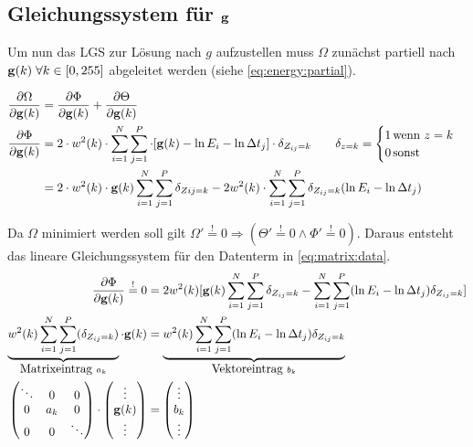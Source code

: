 \subsection{Gleichungssystem für $\mathbf g$}
Um nun das \gls{LGS} zur Lösung nach $g$ aufzustellen muss $\Omega$ zunächst partiell nach $\mathbf g(k) \; \forall k \in [0,255]$ abgeleitet werden (siehe \autoref{eq:energy:partial}).

\begin{align}
\label{eq:energy:partial}
\frac{\partial \Omega}{\partial \mathbf g(k)} & = \frac{\partial \Phi}{\partial \mathbf g(k)} +\frac{\partial \Theta}{\partial \mathbf g(k)}\\
\frac{\partial \Phi}{\partial \mathbf g(k)} &= 2\cdot w^2(k) \cdot \sum \limits_{i=1}^{N} \sum \limits_{j=1}^{P} \cdot[\mathbf g(k) - \ln E_i - \ln \Delta t_j]\cdot \delta_{Z_{ij}=k} \qquad \delta_{z=k} = \begin{cases}
    1 \, \mbox{wenn } z = k\\
    0 \, \mbox{sonst}
\end{cases}\\
&=2\cdot w^2(k) \cdot \mathbf g(k) \sum \limits_{i=1}^{N} \sum \limits_{j=1}^{P}\delta_{Z{ij}=k} - 2w^2(k)\cdot\sum \limits_{i=1}^{N} \sum \limits_{j=1}^{P}\delta_{Z_{ij}=k}(\ln E_i - \ln \Delta t_j)
\end{align}

Da $\Omega$ minimiert werden soll gilt $\Omega' \overset{!}{=} 0 \Rightarrow (\Theta' \overset{!}{=} 0 \wedge \Phi' \overset{!}{=} 0)$. Daraus entsteht das lineare Gleichungssystem für den Datenterm in \autoref{eq:matrix:data}.
\begin{align}
\frac{\partial \Phi}{\partial \mathbf g(k)} 
    \overset{!}{=} 0 & = 
    2 w^2(k) [\mathbf g(k) \sum_{i=1}^{N} \sum_{j=1}^{P}\delta_{Z_{ij}=k} - 
    \sum_{i=1}^{N} \sum_{j=1}^{P}(\ln E_i - \ln \Delta t_j)\delta_{Z_{ij}=k}]\\
    \underbrace{
        w^2(k) \sum_{i=1}^{N} \sum_{j=1}^{P}(\delta_{Z_{ij}=k})
    }_{\mbox{Matrixeintrag }a_k} 
    \cdot \mathbf g(k) &= 
    \underbrace{
        w^2(k) \sum_{i=1}^{N} \sum_{j=1}^{P}(\ln E_i - \ln \Delta t_j)\delta_{Z_{ij}=k}
    }_{\mbox{Vektoreintrag }b_k} \\ 
\begin{pmatrix}
\ddots & 0& 0\\
0 & a_k & 0\\
0 & 0 & \ddots
\end{pmatrix}
 \cdot \begin{pmatrix}
 \vdots\\
 \mathbf g(k)\\
 \vdots
 \end{pmatrix} &= \label{eq:matrix:data}
\begin{pmatrix}
 \vdots\\
 b_k\\
 \vdots
 \end{pmatrix} 
\end{align}


